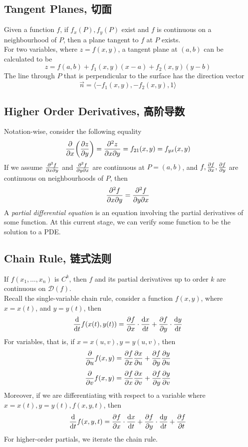 \subsection{Tangent Planes, 切面}
Given a function $f$, if $f_x(P), f_y(P)$ exist and $f$ is continuous on a neighbourhood of $P$, then a plane tangent to $f$ at $P$ exists. \\
For two variables, where $z = f(x, y)$, a tangent plane at $(a, b)$ can be calculated to be
$$z = f(a, b) + f_1(x, y)(x-a) + f_2(x, y)(y - b)$$
The line through $P$ that is perpendicular to the surface has the direction vector
$$\Vec{n} = \langle -f_1(x, y), -f_2(x, y), 1 \rangle$$

\subsection{Higher Order Derivatives, 高阶导数}
Notation-wise, consider the following equality
$$\pderivative{x}(\pdv{z}{y}) = \pdv{z}{x}{y} = f_{21}(x, y) = f_{yx}(x, y)$$
If we assume $\pdv{f}{x}{y}$ and $\pdv{f}{y}{x}$ are continuous at $P = (a, b)$, and $f, \pdv{f}{x}, \pdv{f}{y}$ are continuous on neighbourhoods of $P$, then
$$\pdv{f}{x}{y} = \pdv{f}{y}{x}$$
A \textit{partial differential equation} is an equation involving the partial derivatives of some function. At this current stage, we can verify some function to be the solution to a PDE.

\subsection{Chain Rule, 链式法则}
If $f(x_1, \dots, x_n)$ is $C^k$, then $f$ and its partial derivatives up to order $k$ are continuous on $\mathscr{D}(f)$. \\
Recall the single-variable chain rule, consider a function $f(x, y)$, where $x = x(t)$, and $y = y(t)$, then
$$\dv{t}f(x(t), y(t)) = \pdv{f}{x} \cdot \dv{x}{t} + \pdv{f}{y} \cdot \dv{y}{t}$$
For variables, that is, if $x = x(u, v), y = y(u, v)$, then
$$\pdv{u}f(x, y) = \pdv{f}{x} \pdv{x}{u} + \pdv{f}{y} \pdv{y}{u}$$
$$\pdv{v}f(x, y) = \pdv{f}{x} \pdv{x}{v} + \pdv{f}{y} \pdv{y}{v}$$
Moreover, if we are differentiating with respect to a variable where $x = x(t), y = y(t), f(x, y, t)$, then
$$\dv{t}f(x, y, t) = \pdv{f}{x} \cdot \dv{x}{t} + \pdv{f}{y} \cdot \dv{y}{t} + \pdv{f}{t} $$
For higher-order partials, we iterate the chain rule. \\

\newpage
